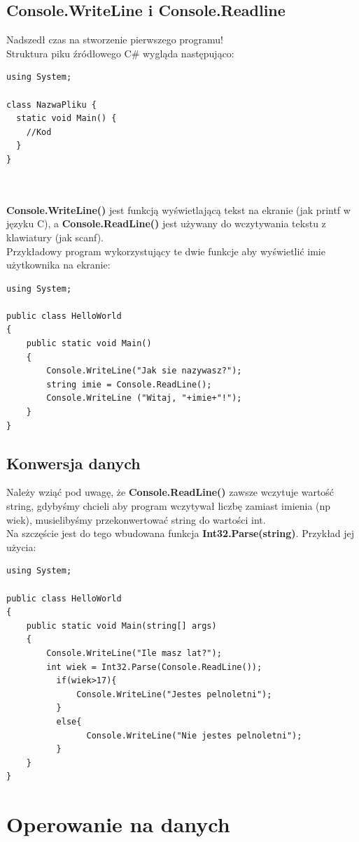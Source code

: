 \documentclass[a4paper]{article}
\theoremstyle{definition}
\begin{document}
\subsection{Console.WriteLine i Console.Readline}
Nadszedł czas na stworzenie pierwszego programu!
\\Struktura piku źródłowego C\# wygląda następująco:
\lstset{language=C}
\begin{lstlisting}[frame=single]
using System;

class NazwaPliku {
  static void Main() {
    //Kod
  }
}
\end{lstlisting}
\\	\\\textbf{Console.WriteLine()} jest funkcją wyświetlającą tekst na ekranie (jak printf w języku C), a \textbf{Console.ReadLine()} jest używany do wczytywania tekstu z klawiatury (jak scanf).
\\Przykładowy program wykorzystujący te dwie funkcje aby wyświetlić imie użytkownika na ekranie:
\lstset{language=C}
\begin{lstlisting}[frame=single]
using System;

public class HelloWorld
{
    public static void Main()
    {
        Console.WriteLine("Jak sie nazywasz?");
        string imie = Console.ReadLine();
        Console.WriteLine ("Witaj, "+imie+"!");
    }
}
\end{lstlisting}
\subsection{Konwersja danych}
Należy wziąć pod uwagę, że \textbf{Console.ReadLine()} zawsze wczytuje wartość string, gdybyśmy chcieli aby program wczytywał liczbę zamiast imienia (np wiek), musielibyśmy przekonwertować string do wartości int.\\
Na szczęście jest do tego wbudowana funkcja \textbf{Int32.Parse(string)}. Przykład jej użycia:\\
\begin{lstlisting}[frame=single]
using System;

public class HelloWorld
{
    public static void Main(string[] args)
    {
        Console.WriteLine("Ile masz lat?");
        int wiek = Int32.Parse(Console.ReadLine());
	      if(wiek>17){
        	  Console.WriteLine("Jestes pelnoletni");
	      }
	      else{
		        Console.WriteLine("Nie jestes pelnoletni");
	      }
    }
}
\end{lstlisting}
\section{Operowanie na danych}
\end{document}

